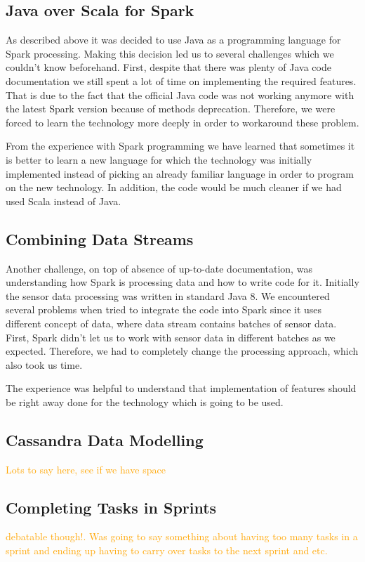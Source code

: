 \documentclass[prodmode,acmtosem]{acmsmall} %
\begin{document}
\subsection{Java over Scala for Spark}
As described above it was decided to use Java as a programming language for Spark processing. Making this decision led us to several challenges which we couldn't know beforehand. First, despite that there was plenty of Java code documentation we still spent a lot of time on implementing the required features. That is due to the fact that the official Java code was not working anymore with the latest Spark version because of methods deprecation. Therefore, we were forced to learn the technology more deeply in order to workaround these problem. 

From the experience with Spark programming we have learned that sometimes it is better to learn a new language for which the technology was initially implemented instead of picking an already familiar language in order to program on the new technology. In addition, the code would be much cleaner if we had used Scala instead of Java.

\subsection{Combining Data Streams}
Another challenge, on top of absence of up-to-date documentation, was understanding how Spark is processing data and how to write code for it. Initially the sensor data processing was written in standard Java 8. We encountered several problems when tried to integrate the code into Spark since it uses different concept of data, where data stream contains batches of sensor data. First, Spark didn't let us to work with sensor data in different batches as we expected. Therefore, we had to completely change the processing approach, which also took us time.

The experience was helpful to understand that implementation of features should be right away done for the technology which is going to be used.

\subsection{Cassandra Data Modelling}
\textcolor{orange}{Lots to say here, see if we have space}

\subsection{Completing Tasks in Sprints}\textcolor{orange}{debatable though!. Was going to say something about having too many tasks in a sprint and ending up having to carry over tasks to the next sprint and etc.}
\end{document}
